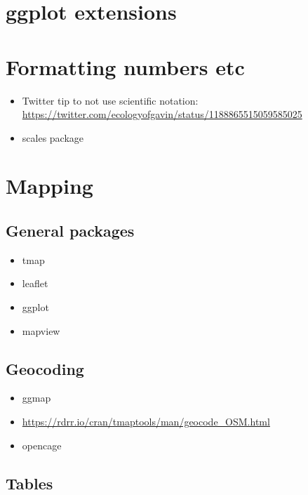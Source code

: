 \documentclass[]{book}
\providecommand{\tightlist}{%
  \setlength{\itemsep}{0pt}\setlength{\parskip}{0pt}}
\begin{document}
\hypertarget{ggplot-extensions}{%
\section{ggplot extensions}\label{ggplot-extensions}}

\hypertarget{formatting-numbers-etc}{%
\section{Formatting numbers etc}\label{formatting-numbers-etc}}

\begin{itemize}
\tightlist
\item
  Twitter tip to not use scientific notation: \url{https://twitter.com/ecologyofgavin/status/1188865515059585025}
\item
  scales package
\end{itemize}

\hypertarget{mapping}{%
\section{Mapping}\label{mapping}}

\hypertarget{general-packages}{%
\subsection{General packages}\label{general-packages}}

\begin{itemize}
\tightlist
\item
  tmap
\item
  leaflet
\item
  ggplot
\item
  mapview
\end{itemize}

\hypertarget{geocoding}{%
\subsection{Geocoding}\label{geocoding}}

\begin{itemize}
\tightlist
\item
  ggmap
\item
  \url{https://rdrr.io/cran/tmaptools/man/geocode_OSM.html}
\item
  opencage
\end{itemize}

\hypertarget{tables-1}{%
\subsection{Tables}\label{tables-1}}
\end{document}
